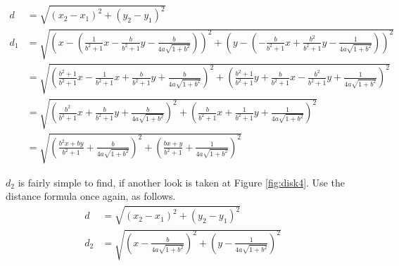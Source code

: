 \documentclass{article}
\begin{document}
\begin{align*}
d &= \sqrt{\left(x_2-x_1\right)^2+\left(y_2-y_1\right)^2}\\
d_1 &= \sqrt{\left(x-\left(\frac{1}{b^2+1}x-\frac{b}{b^2+1}y-\frac{b}{4a\sqrt{1+b^2}}\right)\right)^2+\left(y-\left(-\frac{b}{b^2+1}x+\frac{b^2}{b^2+1}y-\frac{1}{4a\sqrt{1+b^2}}\right)\right)^2}\\
       &= \sqrt{\left(\frac{b^2+1}{b^2+1}x-\frac{1}{b^2+1}x+\frac{b}{b^2+1}y+\frac{b}{4a\sqrt{1+b^2}}\right)^2+\left(\frac{b^2+1}{b^2+1}y+\frac{b}{b^2+1}x-\frac{b^2}{b^2+1}y+\frac{1}{4a\sqrt{1+b^2}}\right)^2}\\
       &= \sqrt{\left(\frac{b^2}{b^2+1}x+\frac{b}{b^2+1}y+\frac{b}{4a\sqrt{1+b^2}}\right)^2+\left(\frac{b}{b^2+1}x+\frac{1}{b^2+1}y+\frac{1}{4a\sqrt{1+b^2}}\right)^2}\\
       &= \sqrt{\left(\frac{b^2x+by}{b^2+1}+\frac{b}{4a\sqrt{1+b^2}}\right)^2+\left(\frac{bx+y}{b^2+1}+\frac{1}{4a\sqrt{1+b^2}}\right)^2}\tag{13}
\end{align*}

$d_2$ is fairly simple to find, if another look is taken at Figure \ref{fig:disk4}. Use the distance formula once again, as follows.
\begin{align*}
d &= \sqrt{\left(x_2-x_1\right)^2+\left(y_2-y_1\right)^2}\\
d_2 &= \sqrt{\left(x-\frac{b}{4a\sqrt{1+b^2}}\right)^2+\left(y-\frac{1}{4a\sqrt{1+b^2}}\right)^2}\tag{14}
\end{align*}
\end{document}

